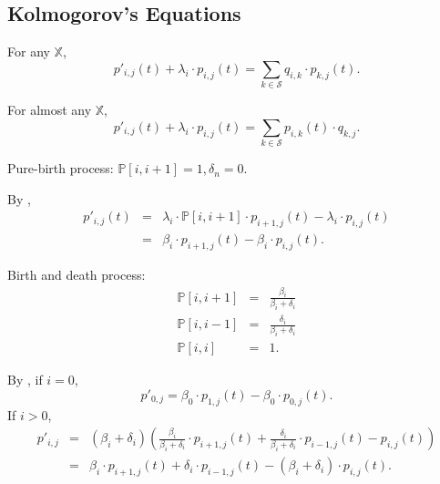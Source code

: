 \subsection{Kolmogorov's Equations}

\begin{theorem} \label{thm:backward_eq}
For any $ \mathbb{X} $,
\[ p'_{i, j}(t) + \lambda_{i} \cdot p_{i, j}(t) = \sum_{k \in \mathcal{S}} q_{i, k} \cdot p_{k, j}(t). \]
\end{theorem}

\begin{theorem} \label{thm:forward_eq}
For almost any $ \mathbb{X} $,
\[ p'_{i, j}(t) + \lambda_{i} \cdot p_{i, j}(t) = \sum_{k \in \mathcal{S}} p_{i, k}(t) \cdot q_{k, j}. \]
\end{theorem}

\begin{example}
Pure-birth process: $ \mathbb{P}[i, i + 1] = 1, \delta_{n} = 0 $.

By ,
\begin{eqnarray*}
p'_{i, j}(t)
  & = & \lambda_{i} \cdot \mathbb{P}[i, i + 1] \cdot p_{i + 1, j}(t) - \lambda_{i} \cdot p_{i, j}(t) \\
  & = & \beta_{i} \cdot p_{i + 1, j}(t) - \beta_{i} \cdot p_{i, j}(t).
\end{eqnarray*}
\end{example}

\begin{example} \label{ex:backward_birth_and_death}
Birth and death process:
\begin{eqnarray*}
\mathbb{P}[i, i + 1] & = & \frac{\beta_{i}}{\beta_{i} + \delta_{i}} \\
\mathbb{P}[i, i - 1] & = & \frac{\delta_{i}}{\beta_{i} + \delta_{i}} \\
\mathbb{P}[i, i] & = & 1.
\end{eqnarray*}

By , if $ i = 0 $,
\[ p'_{0, j} = \beta_{0} \cdot p_{1, j}(t) - \beta_{0} \cdot p_{0, j}(t). \]
If $ i > 0 $,
\begin{eqnarray*}
p'_{i, j}
  & = & (\beta_{i} + \delta_{i}) \left( \frac{\beta_{i}}{\beta_{i} + \delta_{i}} \cdot p_{i + 1, j}(t) + \frac{\delta_{i}}{\beta_{i} + \delta_{i}} \cdot p_{i - 1, j}(t) - p_{i, j}(t) \right) \\
  & = & \beta_{i} \cdot p_{i + 1, j}(t) + \delta_{i} \cdot p_{i - 1, j}(t) - (\beta_{i} + \delta_{i}) \cdot p_{i, j}(t).
\end{eqnarray*}
\end{example}

